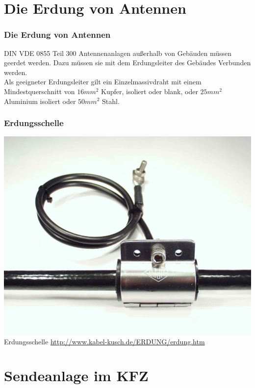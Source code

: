 \section*{Die Erdung von Antennen}

\begin{frame}
    \frametitle{Die Erdung von Antennen}
    \begin{center}
	\begin{block}{DIN VDE 0855 Teil 300}
		Antennenanlagen außerhalb von Gebäuden müssen geerdet werden. Dazu müssen sie mit dem Erdungsleiter des Gebäudes Verbunden werden. \\ Als geeigneter Erdungsleiter gilt ein Einzelmassivdraht mit einem Mindestquerschnitt von $16 mm^2$ Kupfer, isoliert oder blank, oder $25 mm^2$ Aluminium isoliert oder $50 mm^2$ Stahl.
	\end{block}
    \end{center}
\end{frame}

\begin{frame}
    \frametitle{Erdungsschelle}
    \begin{center}
		\includegraphics[height=0.9\textheight]{a19/AntenneErden.jpg}\\
        \tiny Erdungsschelle \url{http://www.kabel-kusch.de/ERDUNG/erdung.htm} \\[1em]
    \end{center}
\end{frame}

\section*{Sendeanlage im KFZ}


